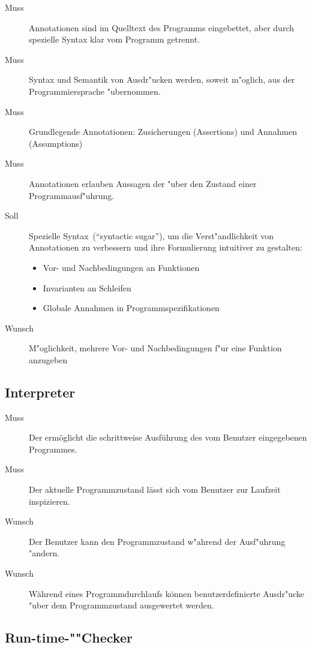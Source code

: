\begin{description}%
    \item [Muss] Annotationen sind im Quelltext des Programms eingebettet, aber durch spezielle Syntax klar vom Programm getrennt.%
    \item [Muss] Syntax und Semantik von Ausdr"ucken werden, soweit m"oglich, aus der Programmiersprache "ubernommen.%
    \item [Muss] Grundlegende Annotationen: Zusicherungen (Assertions) und Annahmen (Assumptions)%
    \item [Muss] Annotationen erlauben Aussagen der  "uber den Zustand einer Programmausf"uhrung.%
    \item [Soll] Spezielle Syntax~("`syntactic sugar"'), um die Verst"andlichkeit von Annotationen zu verbessern und ihre Formulierung intuitiver zu gestalten:%
        \begin{itemize}%
            \item Vor- und Nachbedingungen an Funktionen%
            \item Invarianten an Schleifen%
            \item Globale Annahmen in Programmspezifikationen%
        \end{itemize}%
    \item [Wunsch] M"oglichkeit, mehrere Vor- und Nachbedingungen f"ur eine Funktion anzugeben%
\end{description}%

\subsection{Interpreter}%

\begin{description}%
    \item[Muss] Der  ermöglicht die schrittweise Ausführung des vom Benutzer eingegebenen Programmes.%
    \item[Muss] Der aktuelle Programmzustand lässt sich vom Benutzer zur Laufzeit inspizieren.%
    \item[Wunsch] Der Benutzer kann den Programmzustand w"ahrend der Ausf"uhrung "andern.%
    \item[Wunsch] Während eines Programmdurchlaufs können benutzerdefinierte Ausdr"ucke "uber dem Programmzustand ausgewertet werden.%
\end{description}%

\subsection{Run-time-""Checker}%


